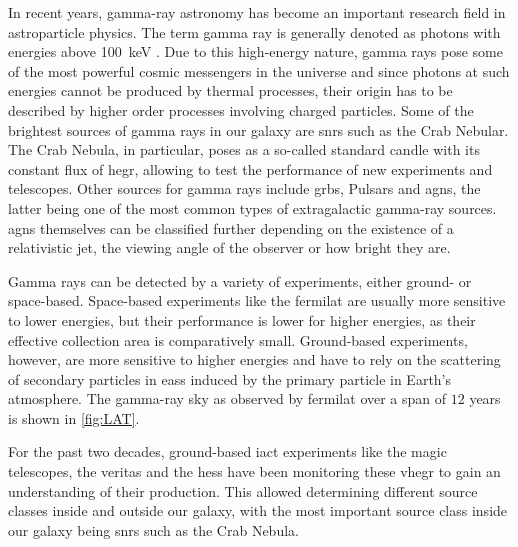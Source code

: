 In recent years, gamma-ray astronomy has become an important research field in astroparticle physics.
The term gamma ray is generally denoted as photons with energies above \SI{100}{\kilo\eV}
\cite{funk}. Due to this high-energy nature, gamma rays pose some of the most powerful cosmic messengers in
the universe and since photons at such energies cannot be produced by thermal processes, their origin
has to be described by higher order processes involving charged particles.
Some of the brightest sources of gamma rays in our galaxy are \glspl{snr} such as the Crab Nebular.
The Crab Nebula, in particular, poses as a so-called standard candle with its constant flux of
\gls{hegr}, allowing to test the performance of new experiments and telescopes. Other sources for
gamma rays include \glspl{grb}, Pulsars and \glspl{agn}, the latter being one of the most common types
of extragalactic gamma-ray sources.
\glspl{agn} themselves can be classified further depending on the existence
of a relativistic jet, the viewing angle of the observer or how bright they are.

Gamma rays can be detected by a variety of experiments, either ground- or space-based. Space-based
experiments like the \gls{fermilat} are usually more sensitive to lower energies, but their performance
is lower for higher energies, as their effective collection area is comparatively small. Ground-based
experiments, however, are more sensitive to higher energies and have to rely on the scattering
of secondary particles in \glspl{eas} induced by the primary particle in Earth's atmosphere.
The gamma-ray sky as observed by \gls{fermilat} over a span of
\(\num{12}\) years is shown in \autoref{fig:LAT}.

For the past two decades, ground-based \gls{iact} experiments like the \gls{magic} telescopes, the
\gls{veritas} and the \gls{hess} have been monitoring these \gls{vhegr} to gain an understanding of
their production. This allowed determining different source classes inside and outside our galaxy,
with the most important source class inside our galaxy being \glspl{snr} such as the Crab Nebula.





